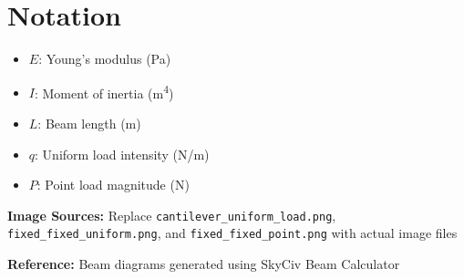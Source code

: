 \documentclass[12pt]{article}
\begin{document}
\section*{Notation}
\begin{itemize}
    \item $E$: Young's modulus (Pa)
    \item $I$: Moment of inertia (m\textsuperscript{4})
    \item $L$: Beam length (m)
    \item $q$: Uniform load intensity (N/m)
    \item $P$: Point load magnitude (N)
\end{itemize}

\vspace{1em}
\textbf{Image Sources:} Replace \texttt{cantilever\_uniform\_load.png}, \texttt{fixed\_fixed\_uniform.png}, and \texttt{fixed\_fixed\_point.png} with actual image files

\textbf{Reference:} Beam diagrams generated using SkyCiv Beam Calculator
\end{document}

